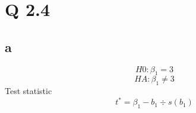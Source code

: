

\section{Q 2.4}
\subsection{a}
$$ H0 : \beta_{1} = 3 $$
$$ HA : \beta_{1} \neq 3 $$
Test statistic $$ t^{*} = \beta_{1} - b_{1} \div s(b_{1}) $$
 
